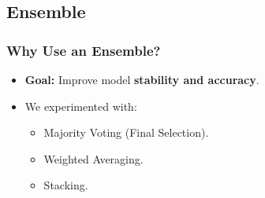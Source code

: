 \subsection{Ensemble}
\label{subsec:ensemble}

\begin{frame}
    \frametitle{Why Use an Ensemble?}
    \begin{itemize}
        \item \textbf{Goal:} Improve model \textbf{stability and accuracy}.
        \item We experimented with:
            \begin{itemize}
                \item Majority Voting (Final Selection).
                \item Weighted Averaging.
                \item Stacking.
            \end{itemize}
    \end{itemize}
\end{frame}



